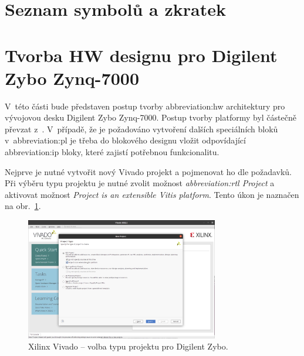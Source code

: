 \documentclass[a4paper, twoside, 11pt]{article}
\newcommand{\fbar}{\FloatBarrier}
\begin{document}
	\begin{appendices}
	\section{Seznam symbolů a zkratek}

		\printglossary[type=abbreviationslist, style = myStyleAbbreviations]

		\fbar
		\newpage
		\printglossary[type=symbolslist, style =  myStyleSymbols]

		\section{Tvorba HW designu pro Digilent Zybo Zynq-7000}\label{sec:appendicies:-tvorba-hw-designu-pro-digilent-zybo-zynq-7000}
		V~této části bude představen postup tvorby \gls{abbreviation:hw} architektury pro vývojovou desku Digilent Zybo Zynq-7000. Postup tvorby platformy byl částečně převzat z~\cite{hackster-vitis-2021-1-embedded-platform-for-zybo-z7-20}. V~případě, že je požadováno vytvoření dalších speciálních bloků v~\gls{abbreviation:pl} je třeba do blokového designu vložit odpovídající \gls{abbreviation:ip} bloky, které zajistí potřebnou funkcionalitu.\par
		Nejprve je nutné vytvořit nový Vivado projekt a pojmenovat ho dle požadavků. Při výběru typu projektu je nutné zvolit možnost \textit{\gls{abbreviation:rtl} Project} a aktivovat možnost \textit{Project is an extensible Vitis platform}. Tento úkon je naznačen na obr.~\ref{fig:zybo-xilinx-vivado-flow-01}.

			\begin{figure}[htbp!]
				\centering
				\includegraphics[width=0.75\textwidth]{src/png/zybo-xilinx-vivado-flow/zybo-xilinx-vivado-flow-01.jpg}
				\caption{Xilinx Vivado – volba typu projektu pro Digilent Zybo.}
				\label{fig:zybo-xilinx-vivado-flow-01}
			\end{figure}


\end{appendices}
\end{document}
